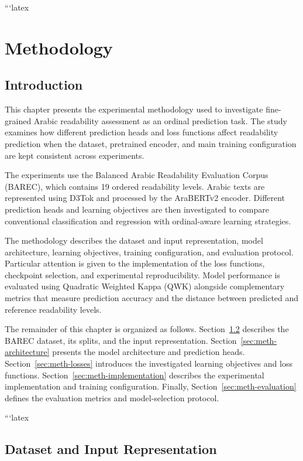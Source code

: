 ```latex
\chapter{Methodology}
\label{chap:methodology}

\section{Introduction}

This chapter presents the experimental methodology used to investigate fine-grained Arabic readability assessment as an ordinal prediction task. The study examines how different prediction heads and loss functions affect readability prediction when the dataset, pretrained encoder, and main training configuration are kept consistent across experiments.

The experiments use the Balanced Arabic Readability Evaluation Corpus (BAREC), which contains 19 ordered readability levels. Arabic texts are represented using D3Tok and processed by the AraBERTv2 encoder. Different prediction heads and learning objectives are then investigated to compare conventional classification and regression with ordinal-aware learning strategies.

The methodology describes the dataset and input representation, model architecture, learning objectives, training configuration, and evaluation protocol. Particular attention is given to the implementation of the loss functions, checkpoint selection, and experimental reproducibility. Model performance is evaluated using Quadratic Weighted Kappa (QWK) alongside complementary metrics that measure prediction accuracy and the distance between predicted and reference readability levels.

The remainder of this chapter is organized as follows. Section~\ref{sec:meth-data} describes the BAREC dataset, its splits, and the input representation. Section~\ref{sec:meth-architecture} presents the model architecture and prediction heads. Section~\ref{sec:meth-losses} introduces the investigated learning objectives and loss functions. Section~\ref{sec:meth-implementation} describes the experimental implementation and training configuration. Finally, Section~\ref{sec:meth-evaluation} defines the evaluation metrics and model-selection protocol.


```latex
\section{Dataset and Input Representation}
\label{sec:meth-data}

